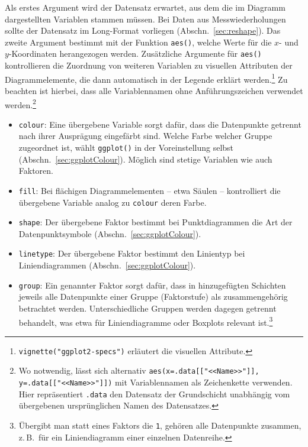 Als erstes Argument wird der Datensatz erwartet, aus dem die im Diagramm dargestellten Variablen stammen müssen. Bei Daten aus Messwiederholungen sollte der Datensatz im Long-Format vorliegen (Abschn.\ \ref{sec:reshape}). Das zweite Argument bestimmt mit der Funktion \lstinline!aes()!, welche Werte für die $x$- und $y$-Koordinaten herangezogen werden. Zusätzliche Argumente für \lstinline!aes()! kontrollieren die Zuordnung von weiteren Variablen zu visuellen Attributen der Diagrammelemente, die dann automatisch in der Legende erklärt werden.\footnote{\lstinline!vignette("ggplot2-specs")! erläutert die visuellen Attribute.} Zu beachten ist hierbei, dass alle Variablennamen ohne Anführungszeichen verwendet werden.\footnote{Wo notwendig, lässt sich alternativ \lstinline!aes(x=.data[["<<Name>>"]], y=.data[["<<Name>>"]])! mit Variablennamen als Zeichenkette verwenden. Hier repräsentiert \lstinline!.data! den Datensatz der Grundschicht unabhängig vom übergebenen ursprünglichen Namen des Datensatzes.}
\begin{itemize}
\item \lstinline!colour!: Eine übergebene Variable sorgt dafür, dass die Datenpunkte getrennt nach ihrer Ausprägung eingefärbt sind. Welche Farbe welcher Gruppe zugeordnet ist, wählt \lstinline!ggplot()! in der Voreinstellung selbst (Abschn.\ \ref{sec:ggplotColour}). Möglich sind stetige Variablen wie auch Faktoren.
\item \lstinline!fill!: Bei flächigen Diagrammelementen -- etwa Säulen -- kontrolliert die übergebene Variable analog zu \lstinline!colour! deren Farbe.
\item \lstinline!shape!: Der übergebene Faktor bestimmt bei Punktdiagrammen die Art der Datenpunktsymbole (Abschn.\ \ref{sec:ggplotColour}).
\item \lstinline!linetype!: Der übergebene Faktor bestimmt den Linientyp bei Liniendiagrammen (Abschn.\ \ref{sec:ggplotColour}).
\item \lstinline!group!: Ein genannter Faktor sorgt dafür, dass in hinzugefügten Schichten jeweils alle Datenpunkte einer Gruppe (Faktorstufe) als zusammengehörig betrachtet werden. Unterschiedliche Gruppen werden dagegen getrennt behandelt, was etwa für Liniendiagramme oder Boxplots relevant ist.\footnote{Übergibt man statt eines Faktors die \lstinline!1!, gehören alle Datenpunkte zusammen, z.\,B.\ für ein Liniendiagramm einer einzelnen Datenreihe.}
\end{itemize}

